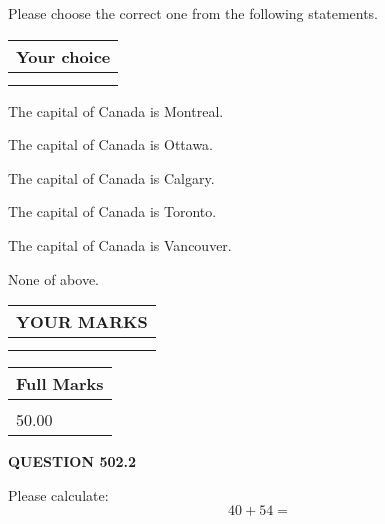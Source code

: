 \documentclass[12pt]{article}
\begin{document}
  
Please choose the correct one from the following statements.
  
  
\noindent\hspace{3.0in} \begin{tabular}{|l|}
\hline
Your choice \\
\hline
 \\ 
 \\ 
\hline
\end{tabular}
  
  
 
 
The capital of Canada is Montreal.
 
 
The capital of Canada is Ottawa.
 
 
The capital of Canada is Calgary.
 
 
The capital of Canada is Toronto.
 
 
The capital of Canada is Vancouver.
 
 
 None of above.
 
 
  
\vspace{0.2in}
  
\noindent\begin{tabular}{|l|}
\hline
 YOUR MARKS  \\
\hline
 \\ 
 \\ 
\hline
\end{tabular}
\hspace{0.05in} \begin{tabular}{|l|}
\hline
 Full Marks  \\
\hline
 \\ 
50.00 \\
\hline
\end{tabular}
{\textbf{\Large{QUESTION
502.2 
}}}
  
  
 
Please calculate:
\begin{equation}
40 +  %
54 = \nonumber
\end{equation}
 

 

 
   
   
 \vspace{0.2in}
 
   
   
   
   
\end{document}
